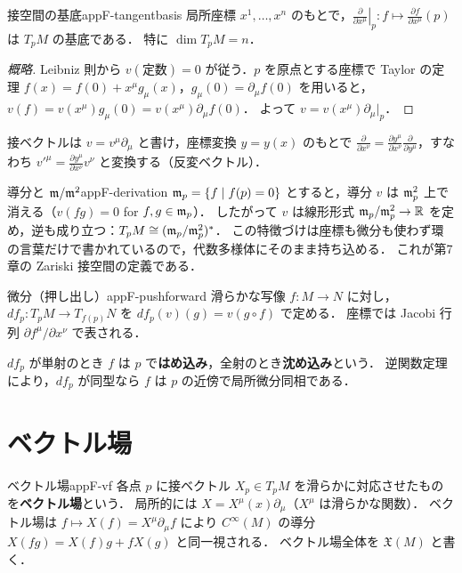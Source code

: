 \begin{myprop}{接空間の基底}{appF-tangentbasis}
局所座標 $x^1,\dots,x^n$ のもとで，$\left.\frac{\partial}{\partial x^\mu}\right|_p\colon f\mapsto\frac{\partial f}{\partial x^\mu}(p)$ は $T_pM$ の基底である．
特に $\dim T_pM=n$．
\end{myprop}
\begin{proof}[概略]
Leibniz 則から $v(\text{定数})=0$ が従う．$p$ を原点とする座標で Taylor の定理
$f(x)=f(0)+x^\mu g_\mu(x)$，$g_\mu(0)=\partial_\mu f(0)$ を用いると，$v(f)=v(x^\mu)g_\mu(0)=v(x^\mu)\partial_\mu f(0)$．
よって $v=v(x^\mu)\partial_\mu|_p$．
\end{proof}

接ベクトルは $v=v^\mu\partial_\mu$ と書け，座標変換 $y=y(x)$ のもとで
$\frac{\partial}{\partial x^\nu}=\frac{\partial y^\mu}{\partial x^\nu}\frac{\partial}{\partial y^\mu}$，すなわち $v'^\mu=\frac{\partial y^\mu}{\partial x^\nu}v^\nu$ と変換する（反変ベクトル）．

\begin{myex}{導分と $\mathfrak{m}/\mathfrak{m}^2$}{appF-derivation}
$\mathfrak{m}_p=\{f\mid f(p)=0\}$ とすると，導分 $v$ は $\mathfrak{m}_p^2$ 上で消える（$v(fg)=0$ for $f,g\in\mathfrak{m}_p$）．
したがって $v$ は線形形式 $\mathfrak{m}_p/\mathfrak{m}_p^2\to\mathbb{R}$ を定め，逆も成り立つ：$T_pM\cong(\mathfrak{m}_p/\mathfrak{m}_p^2)^*$．
この特徴づけは座標も微分も使わず環の言葉だけで書かれているので，代数多様体にそのまま持ち込める．
これが第7章の Zariski 接空間の定義である．
\end{myex}

\begin{mydef}{微分（押し出し）}{appF-pushforward}
滑らかな写像 $f\colon M\to N$ に対し，$df_p\colon T_pM\to T_{f(p)}N$ を $df_p(v)(g)=v(g\circ f)$ で定める．
座標では Jacobi 行列 $\partial f^\mu/\partial x^\nu$ で表される．
\end{mydef}

$df_p$ が単射のとき $f$ は $p$ で\textbf{はめ込み}，全射のとき\textbf{沈め込み}という．
逆関数定理により，$df_p$ が同型なら $f$ は $p$ の近傍で局所微分同相である．

\section{ベクトル場}

\begin{mydef}{ベクトル場}{appF-vf}
各点 $p$ に接ベクトル $X_p\in T_pM$ を滑らかに対応させたものを\textbf{ベクトル場}という．
局所的には $X=X^\mu(x)\partial_\mu$（$X^\mu$ は滑らかな関数）．
ベクトル場は $f\mapsto X(f)=X^\mu\partial_\mu f$ により $C^\infty(M)$ の導分 $X(fg)=X(f)g+fX(g)$ と同一視される．
ベクトル場全体を $\mathfrak X(M)$ と書く．
\end{mydef}

